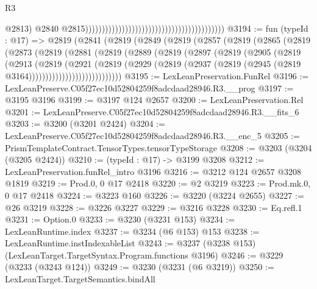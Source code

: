 \begin{lexlean}{R3}
\begin{coremodule}
                                                                                          @2813)
                                                                                        @2840
                                                                                        @2815))))))))))))))))))))))))))))))))))))))))))
@3194 := fun (typeId : @17) =>
  @2819
    (@2841
      (@2819
        (@2849
          (@2819
            (@2857
              (@2819
                (@2865
                  (@2819
                    (@2873
                      (@2819
                        (@2881
                          (@2819
                            (@2889
                              (@2819
                                (@2897
                                  (@2819
                                    (@2905
                                      (@2819
                                        (@2913
                                          (@2819
                                            (@2921
                                              (@2819
                                                (@2929
                                                  (@2819
                                                    (@2937
                                                      (@2819
                                                        (@2945
                                                          (@2819 @3164))))))))))))))))))))))))))))
@3195 := LexLeanPreservation.FunRel
@3196 := LexLeanPreserve.C05f27ec10d52804259f8adcdaad28946.R3.__prog
@3197 := @3195 @3196
@3199 := @3197 @124 @2657
@3200 := LexLeanPreservation.Rel
@3201 := LexLeanPreserve.C05f27ec10d52804259f8adcdaad28946.R3.__fits_6
@3203 := @3200 (@3201 @2424)
@3204 := LexLeanPreserve.C05f27ec10d52804259f8adcdaad28946.R3.__enc_5
@3205 := PrismTemplateContract.TensorTypes.tensorTypeStorage
@3208 := @3203 (@3204 (@3205 @2424))
@3210 := (typeId : @17) -> @3199 @3208
@3212 := LexLeanPreservation.funRel_intro @3196
@3216 := @3212 @124 @2657 @3208 @1819
@3219 := Prod.{0, 0} @17 @2418
@3220 := @2 @3219
@3223 := Prod.mk.{0, 0} @17 @2418
@3224 := @3223 @160
@3226 := @3220 (@3224 @2655)
@3227 := @26 @3219
@3228 := @3226 @3227
@3229 := @3216 @3228
@3230 := Eq.refl.{1}
@3231 := Option.{0}
@3233 := @3230 (@3231 @153)
@3234 := LexLeanRuntime.index
@3237 := @3234 (@6 @153) @153
@3238 := LexLeanRuntime.instIndexableList
@3243 := @3237 (@3238 @153) (LexLeanTarget.TargetSyntax.Program.functions @3196)
@3246 := @3229 (@3233 (@3243 @124))
@3249 := @3230 (@3231 (@6 @3219))
@3250 := LexLeanTarget.TargetSemantics.bindAll

\end{coremodule}
\end{lexlean}
